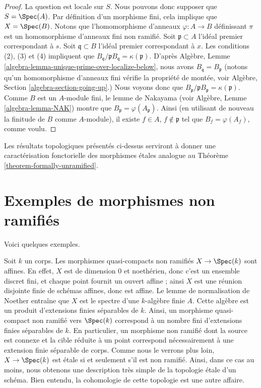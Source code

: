 \begin{proof}
La question est locale sur $S$. Nous pouvons donc supposer que $S = \Spec(A)$.
Par définition d'un morphisme fini, cela implique que $X = \Spec(B)$.
Notons que l'homomorphisme d'anneaux $\varphi : A \to B$ définissant $\pi$
est un homomorphisme d'anneaux fini non ramifié.
Soit $\mathfrak p \subset A$ l'idéal premier correspondant à $s$.
Soit $\mathfrak q \subset B$ l'idéal premier correspondant à $x$.
Les conditions (2), (3) et (4) impliquent que
$B_{\mathfrak q}/\mathfrak pB_{\mathfrak q} = \kappa(\mathfrak p)$.
D'après Algèbre, Lemme \ref{algebra-lemma-unique-prime-over-localize-below},
nous avons $B_{\mathfrak q} = B_{\mathfrak p}$
(notons qu'un homomorphisme d'anneaux fini vérifie la propriété de montée, voir
Algèbre, Section \ref{algebra-section-going-up}.)
Nous voyons donc que
$B_{\mathfrak p}/\mathfrak pB_{\mathfrak p} = \kappa(\mathfrak p)$.
Comme $B$ est un $A$-module fini, le lemme de Nakayama (voir
Algèbre, Lemme \ref{algebra-lemma-NAK})
montre que $B_{\mathfrak p} = \varphi(A_{\mathfrak p})$. Ainsi (en utilisant de
nouveau la finitude de $B$ comme $A$-module), il existe
$f \in A$, $f \not \in \mathfrak p$ tel que $B_f = \varphi(A_f)$,
comme voulu.
\end{proof}

\noindent
Les résultats topologiques présentés ci-dessus serviront à donner une
caractérisation fonctorielle des morphismes \'etales analogue au Théorème
\ref{theorem-formally-unramified}.




\section{Exemples de morphismes non ramifiés}
\label{section-examples}

\noindent
Voici quelques exemples.

\begin{example}
\label{example-etale-field-extensions}
Soit $k$ un corps.
Les morphismes quasi-compacts non ramifiés $X \to \Spec(k)$ sont affines.
En effet, $X$ est de dimension $0$ et noethérien,
donc c'est un ensemble discret fini, et chaque point fournit un ouvert affine ;
ainsi $X$ est une réunion disjointe finie de schémas affines, donc est affine.
Le lemme de normalisation de Noether entraîne que $X$ est le spectre d'une
$k$-algèbre finie $A$.
Cette algèbre est un produit d'extensions finies séparables de $k$.
Ainsi, un morphisme quasi-compact non ramifié vers $\Spec(k)$
correspond à un nombre fini d'extensions finies séparables de $k$.
En particulier, un morphisme non ramifié dont la source est connexe et la cible
réduite à un point correspond nécessairement à une extension finie séparable de corps.
Comme nous le verrons plus loin, $X \to \Spec(k)$ est \'etale si et
seulement s'il est non ramifié. Ainsi, dans ce cas au moins, nous obtenons une
description très simple de la topologie \'etale d'un schéma. Bien entendu, la
cohomologie de cette topologie est une autre affaire.
\end{example}

